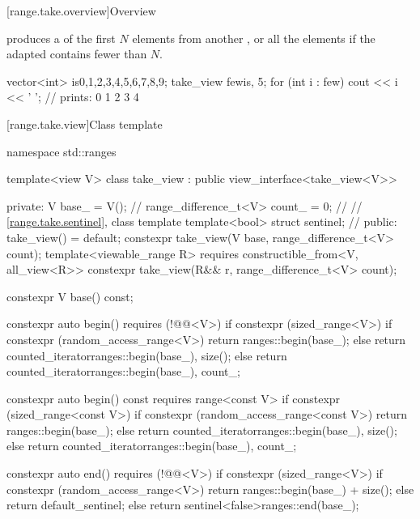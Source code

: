 [range.take.overview]{Overview}

\pnum
{} produces a  of the first $N$ elements
from another , or all the elements if the adapted
 contains fewer than $N$.

\pnum
\begin{example}
\begin{codeblock}
vector<int> is{0,1,2,3,4,5,6,7,8,9};
take_view few{is, 5};
for (int i : few)
  cout << i << ' '; // prints: 0 1 2 3 4
\end{codeblock}
\end{example}

[range.take.view]{Class template }

%
\begin{codeblock}
namespace std::ranges {
  template<view V>
  class take_view : public view_interface<take_view<V>> {
  private:
    V base_ = V();                                      // \expos
    range_difference_t<V> count_ = 0;                   // \expos
    // \ref{range.take.sentinel}, class template 
    template<bool> struct sentinel;                     // \expos
  public:
    take_view() = default;
    constexpr take_view(V base, range_difference_t<V> count);
    template<viewable_range R>
      requires constructible_from<V, all_view<R>>
    constexpr take_view(R&& r, range_difference_t<V> count);

    constexpr V base() const;

    constexpr auto begin() requires (!@@<V>) {
      if constexpr (sized_range<V>) {
        if constexpr (random_access_range<V>)
          return ranges::begin(base_);
        else
          return counted_iterator{ranges::begin(base_), size()};
      } else
        return counted_iterator{ranges::begin(base_), count_};
    }

    constexpr auto begin() const requires range<const V> {
      if constexpr (sized_range<const V>) {
        if constexpr (random_access_range<const V>)
          return ranges::begin(base_);
        else
          return counted_iterator{ranges::begin(base_), size()};
      } else
        return counted_iterator{ranges::begin(base_), count_};
    }

    constexpr auto end() requires (!@@<V>) {
      if constexpr (sized_range<V>) {
        if constexpr (random_access_range<V>)
          return ranges::begin(base_) + size();
        else
          return default_sentinel;
      } else
        return sentinel<false>{ranges::end(base_)};
    }

}}
\end{codeblock}
